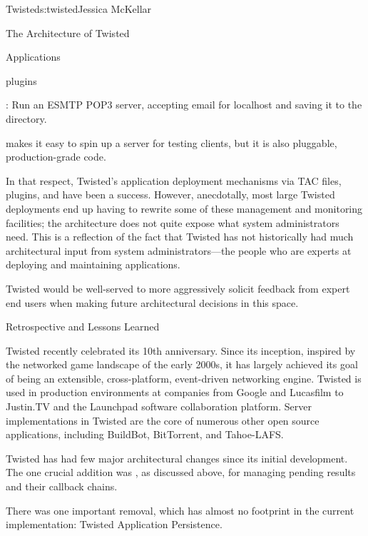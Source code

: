\begin{aosachapter}{Twisted}{s:twisted}{Jessica McKellar}
\begin{aosasect1}{The Architecture of Twisted}
\begin{aosasect2}{Applications}
\begin{aosasect3}{plugins}
\begin{aosaitemize}
\item {}: Run an
  ESMTP POP3 server, accepting email for localhost and saving it to
  the  directory.

\end{aosaitemize}

 makes it easy to spin up a server for testing clients,
but it is also pluggable, production-grade code.

In that respect, Twisted's application deployment mechanisms via TAC files,
plugins, and  have been a success. However, anecdotally, most
large Twisted deployments end up having to rewrite some of these management and
monitoring facilities; the architecture does not quite expose what system
administrators need. This is a reflection of the fact that Twisted has not
historically had much architectural input from system administrators---the
people who are experts at deploying and maintaining applications.

Twisted would be well-served to more aggressively solicit feedback from
expert end users when making future architectural decisions in this space.

\end{aosasect3}

\end{aosasect2}

\end{aosasect1}

\begin{aosasect1}{Retrospective and Lessons Learned}

Twisted recently celebrated its 10th anniversary. Since its inception,
inspired by the networked game landscape of the early 2000s, it has largely
achieved its goal of being an extensible, cross-platform, event-driven
networking engine. Twisted is used in production environments at companies from
Google and Lucasfilm to Justin.TV and the Launchpad software collaboration
platform. Server implementations in Twisted are the core of numerous other open
source applications, including BuildBot, BitTorrent, and Tahoe-LAFS.

Twisted has had few major architectural changes since its initial
development. The one crucial addition was , as
discussed above, for managing pending results and their callback chains.

There was one important removal, which has almost no footprint in the current
implementation: Twisted Application Persistence.


\end{aosasect1}
\end{aosachapter}
